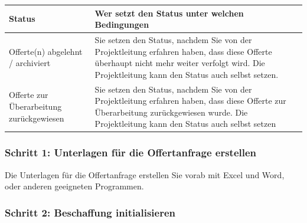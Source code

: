 \begin{tabular}{|p{5cm}|p{9.5cm}|}    %
\hline
\textbf{Status} & \textbf{Wer setzt den Status unter welchen Bedingungen} \\
\hline
Offerte(n) abgelehnt / archiviert & Sie setzen den Status, nachdem Sie von der Projektleitung erfahren haben, dass diese Offerte überhaupt nicht mehr weiter verfolgt wird. Die Projektleitung kann den Status auch selbst setzen. \\
\hline
Offerte zur Überarbeitung zurückgewiesen & Sie setzen den Status, nachdem Sie von der Projektleitung erfahren haben, dass diese Offerte zur Überarbeitung zurückgewiesen wurde. Die Projektleitung kann den Status auch selbst setzen \\
\hline
\end{tabular}

\subsubsection{Schritt 1: Unterlagen für die Offertanfrage erstellen}

Die Unterlagen für die Offertanfrage erstellen Sie vorab mit Excel und Word, oder anderen geeigneten Programmen.

\subsubsection{Schritt 2: Beschaffung initialisieren}

